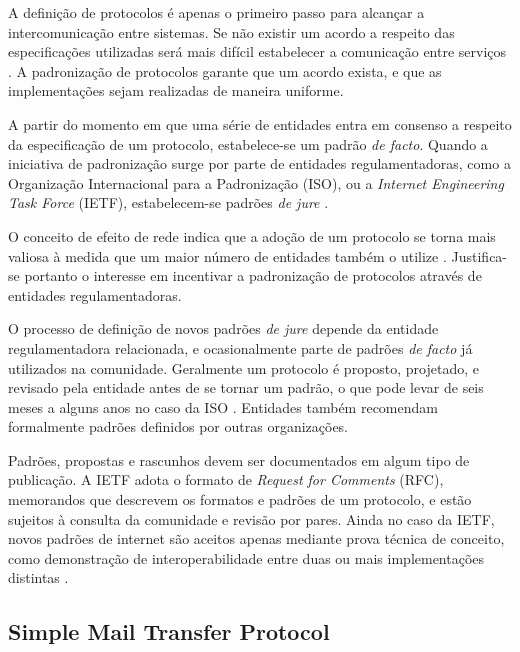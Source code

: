 A definição de protocolos é apenas o primeiro passo para alcançar a intercomunicação
entre sistemas. Se não existir um acordo a respeito das especificações utilizadas
será mais difícil estabelecer a comunicação entre serviços \cite{kurose2012}. A
padronização de protocolos garante que um acordo exista, e que as implementações
sejam realizadas de maneira uniforme.

A partir do momento em que uma série de entidades entra em consenso a respeito da
especificação de um protocolo, estabelece-se um padrão \textit{de facto}. Quando a
iniciativa de padronização surge por parte de entidades regulamentadoras, como a
Organização Internacional para a Padronização (ISO), ou a \textit{Internet
Engineering Task Force} (IETF), estabelecem-se padrões \textit{de jure}
\cite{tanenbaum2010}.

O conceito de efeito de rede indica que a adoção de um protocolo se torna mais
valiosa à medida que um maior número de entidades também o utilize
\cite{liebowitz1998}. Justifica-se portanto o interesse em incentivar a padronização
de protocolos através de entidades regulamentadoras.

O processo de definição de novos padrões \textit{de jure} depende da entidade
regulamentadora relacionada, e ocasionalmente parte de padrões \textit{de facto} já
utilizados na comunidade. Geralmente um protocolo é proposto, projetado, e revisado
pela entidade antes de se tornar um padrão, o que pode levar de seis meses a alguns
anos no caso da ISO \cite{tanenbaum2010}. Entidades também recomendam formalmente
padrões definidos por outras organizações.

Padrões, propostas e rascunhos devem ser documentados em algum tipo de publicação. A
IETF adota o formato de \textit{Request for Comments} (RFC), memorandos que
descrevem os formatos e padrões de um protocolo, e estão sujeitos à consulta da
comunidade e revisão por pares. Ainda no caso da IETF, novos padrões de internet
são aceitos apenas mediante prova técnica de conceito, como demonstração de
interoperabilidade entre duas ou mais implementações distintas \cite{rfc1280}.


\subsection{Simple Mail Transfer Protocol}

